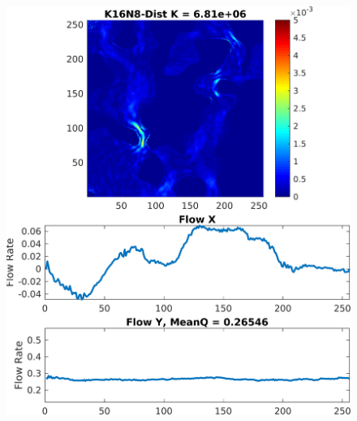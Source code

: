 \documentclass{article}
\begin{document}
\begin{figure}[htp!]
\begin{minipage}[b]{0.33\textwidth}
  \end{minipage}
  \vspace{5mm}
  \begin{minipage}[b]{0.32\textwidth}
    \includegraphics[width=\textwidth]{figures/velCNNs1117-4.png}
  \end{minipage}
  \vspace{5mm}
    \begin{minipage}[b]{0.32\textwidth}

\end{minipage}
\end{figure}
\end{document}

